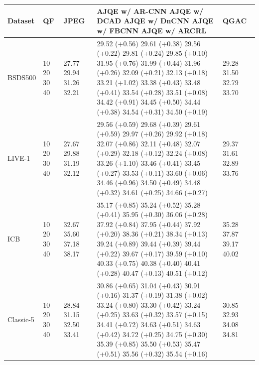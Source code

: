 \begin{tabular}{lllll}
\toprule
Dataset & QF & JPEG & AJQE w/ AR-CNN AJQE w/ DCAD AJQE w/ DnCNN AJQE w/ FBCNN AJQE w/ ARCRL & QGAC \\
\midrule
BSDS500 & 10 20 30 40 & 27.77 29.94 31.26 32.21 & 29.52 (+0.56) 29.61 (+0.38) 29.56 (+0.22) 29.81 (+0.24) 29.85 (+0.10) 31.95 (+0.76) 31.99 (+0.44) 31.96 (+0.26) 32.09 (+0.21) 32.13 (+0.18) 33.21 (+1.02) 33.38 (+0.43) 33.48 (+0.41) 33.54 (+0.28) 33.51 (+0.08) 34.42 (+0.91) 34.45 (+0.50) 34.44 (+0.38) 34.54 (+0.31) 34.50 (+0.19) & 29.28 31.50 32.79 33.70 \\
LIVE-1 & 10 20 30 40 & 27.67 29.88 31.19 32.12 & 29.56 (+0.59) 29.68 (+0.39) 29.61 (+0.59) 29.97 (+0.26) 29.92 (+0.18) 32.07 (+0.86) 32.11 (+0.48) 32.07 (+0.29) 32.18 (+0.12) 32.24 (+0.08) 33.26 (+1.10) 33.46 (+0.41) 33.45 (+0.27) 33.53 (+0.11) 33.60 (+0.06) 34.46 (+0.96) 34.50 (+0.49) 34.48 (+0.32) 34.61 (+0.25) 34.66 (+0.27) & 29.37 31.61 32.89 33.76 \\
ICB & 10 20 30 40 & 32.67 35.60 37.18 38.17 & 35.17 (+0.85) 35.24 (+0.52) 35.28 (+0.41) 35.95 (+0.30) 36.06 (+0.28) 37.92 (+0.84) 37.95 (+0.44) 37.92 (+0.20) 38.36 (+0.21) 38.34 (+0.13) 39.24 (+0.89) 39.44 (+0.39) 39.44 (+0.22) 39.67 (+0.17) 39.59 (+0.10) 40.33 (+0.75) 40.38 (+0.40) 40.41 (+0.28) 40.47 (+0.13) 40.51 (+0.12) & 35.28 37.87 39.17 40.02 \\
Classic-5 & 10 20 30 40 & 28.84 31.15 32.50 33.41 & 30.86 (+0.65) 31.04 (+0.43) 30.91 (+0.16) 31.37 (+0.19) 31.38 (+0.02) 33.24 (+0.80) 33.30 (+0.42) 33.24 (+0.25) 33.63 (+0.32) 33.57 (+0.15) 34.41 (+0.72) 34.63 (+0.51) 34.63 (+0.42) 34.72 (+0.25) 34.75 (+0.30) 35.39 (+0.85) 35.50 (+0.53) 35.47 (+0.51) 35.56 (+0.32) 35.54 (+0.16) & 30.85 32.93 34.08 34.81 \\
\bottomrule
\end{tabular}
